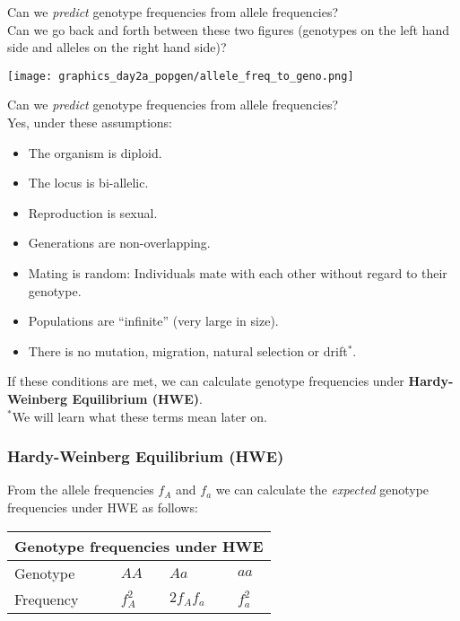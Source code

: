 \documentclass{beamer}
\newcommand{\1}{\ensuremath{\mathbf{1}}}
\begin{document}
%
%
%
\begin{frame}
	Can we \emph{predict} genotype frequencies from allele frequencies?\\
	Can we go back and forth between these two figures (genotypes on the left hand side and alleles on the right hand side)?
	\begin{center}
		\texttt{[image: graphics\_day2a\_popgen/allele\_freq\_to\_geno.png]}
	\end{center}
\end{frame}
%
%
%
\begin{frame}
	Can we \emph{predict} genotype frequencies from allele frequencies?\\
	Yes, under these assumptions:
	\begin{itemize}
		\item The organism is diploid.
		\item The locus is bi-allelic.
		\item Reproduction is sexual.
		\item Generations are non-overlapping.
		\item Mating is random: Individuals mate with each other without regard to their genotype.
		\item Populations are ``infinite'' (very large in size).
		\item There is no mutation, migration, natural selection or drift$^{*}$.
	\end{itemize}
	If these conditions are met, we can calculate genotype frequencies under \textbf{Hardy-Weinberg Equilibrium (HWE)}.\\[1.5ex]
	{\scriptsize $^{*}$We will learn what these terms mean later on.}
\end{frame}
%
%
%
\begin{frame}\frametitle{Hardy-Weinberg Equilibrium (HWE)}
	From the allele frequencies $f_A$ and $f_a$ we can calculate the \emph{expected} genotype frequencies under HWE as follows:
	\begin{center}
	\setlength{\tabcolsep}{12pt}
	\begin{tabular}{llll}
		\toprule
		\multicolumn{4}{l}{Genotype frequencies under HWE} \\
		\midrule
		Genotype	& $AA$		& $Aa$			& $aa$		\\
		Frequency	& $f_A^2$	& $2f_A f_a$	& $f_a^2$	\\
		\bottomrule
	\end{tabular}
	\setlength{\tabcolsep}{6pt}
	\end{center}
\end{frame}
\end{document}
